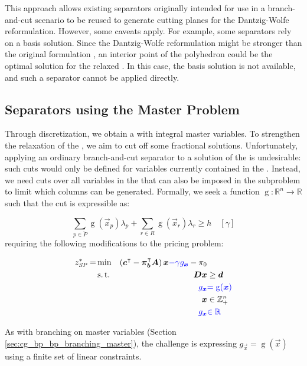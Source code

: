 This approach allows existing separators originally intended for use in a branch-and-cut scenario to be reused to generate cutting planes for the Dantzig-Wolfe reformulation. However, some caveats apply. For example, some separators rely on a basis solution. Since the Dantzig-Wolfe reformulation might be stronger than the original formulation \cite{thebook,bastubbe2018computational}, an interior point of the polyhedron could be the optimal solution for the relaxed \RMP{}. In this case, the basis solution is not available, and such a separator cannot be applied directly.

\subsection{Separators using the Master Problem}\label{sec:cg_bp_bpc_separators_master}
Through discretization, we obtain a \MP{} with integral master variables. To strengthen the \LP{} relaxation of the \MP{}, we aim to cut off some fractional solutions. Unfortunately, applying an ordinary branch-and-cut separator to a solution of the \RMP{} is undesirable: such cuts would only be defined for variables currently contained in the \RMP{}. Instead, we need cuts over all variables in the \MP{} that can also be imposed in the subproblem to limit which columns can be generated. Formally, we seek a function $\operatorname{g}: \mathbb{R}^n \to \mathbb{R}$ such that the cut is expressible as:

\begin{equation}
\sum_{p \in \ddot{P}} \operatorname{g}( \vec{x}_p ) \lambda_p + \sum_{r \in R} \operatorname{g}(  \vec{x}_r ) \lambda_r \geq h \quad \left[ \gamma \right]
\end{equation}
requiring the following modifications to the pricing problem:

\begin{equation}
\begin{aligned}
z^*_\SP{} = &\min & \left( \vec{c}\transpose - \vec{\pi}_\vec{b}\transpose \mat{A} \right) \vec{x} {\color{blue} - \gamma g_\vec{x}} - \pi_0 & \\
&\st & \mat{D} \vec{x} & \geq \vec{d} \\
&& {\color{blue} g_\vec{x}} & {\color{blue} = \operatorname{g}(\vec{x})} \\
&& \vec{x} & \in \mathbb{Z}_+^n \\
&& {\color{blue} g_\vec{x}} & {\color{blue} \in \mathbb{R}}
\end{aligned}
\end{equation}

As with branching on master variables (Section \ref{sec:cg_bp_bp_branching_master}), the challenge is expressing $g_\vec{x} = \operatorname{g}(\vec{x})$ using a finite set of linear constraints.
